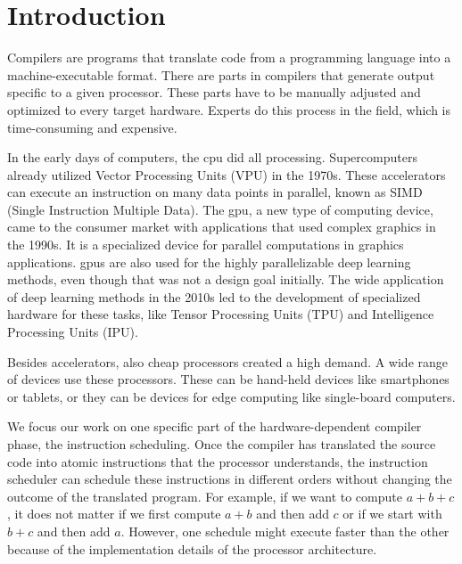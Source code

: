 \chapter{Introduction}
Compilers are programs that translate code from a programming language into a machine-executable format.
There are parts in compilers that generate output specific to a given processor.
These parts have to be manually adjusted and optimized to every target hardware.
Experts do this process in the field, which is time-consuming and expensive.

In the early days of computers, the \ac{cpu} did all processing.
Supercomputers already utilized Vector Processing Units (VPU) in the 1970s.
These accelerators can execute an instruction on many data points in parallel, known as SIMD (Single Instruction Multiple Data).
The \ac{gpu}, a new type of computing device, came to the consumer market with applications that used complex graphics in the 1990s.
It is a specialized device for parallel computations in graphics applications.
\acp{gpu} are also used for the highly parallelizable deep learning methods, even though that was not a design goal initially.
The wide application of deep learning methods in the 2010s led to the development of specialized hardware for these tasks, like Tensor Processing Units (TPU) and Intelligence Processing Units (IPU).

Besides accelerators, also cheap processors created a high demand.
A wide range of devices use these processors.
These can be hand-held devices like smartphones or tablets, or they can be devices for edge computing like single-board computers.

We focus our work on one specific part of the hardware-dependent compiler phase, the instruction scheduling.
Once the compiler has translated the source code into atomic instructions that the processor understands, the instruction scheduler can schedule these instructions in different orders without changing the outcome of the translated program.
For example, if we want to compute $a+b+c$, it does not matter if we first compute $a+b$ and then add $c$ or if we start with $b+c$ and then add $a$.
However, one schedule might execute faster than the other because of the implementation details of the processor architecture.

